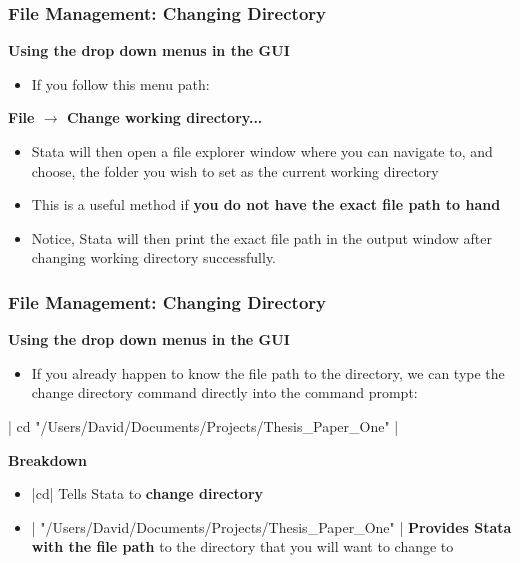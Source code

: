 \documentclass[10pt, compress]{beamer}
\begin{document}
\begin{frame}[fragile]
\frametitle{File Management: Changing Directory}
\textbf{Using the drop down menus in the GUI}
\begin{itemize}
\item If you follow this menu path:
\end{itemize}
\begin{center}
\textbf{File $\to$ Change working directory...}
\end{center}
\begin{itemize}
\item Stata will then open a \alert{file explorer window} where you can navigate to, and choose, the folder you wish to set as the current working directory
\item This is a useful method if \textbf{you do not have the exact file path to hand}
\item Notice, Stata will then print the exact file path in the output window after changing working directory successfully.
\end{itemize}
\end{frame}

\begin{frame}[fragile]
\frametitle{File Management: Changing Directory}
\textbf{Using the drop down menus in the GUI}
\begin{itemize}
\item If you already happen to know the file path to the directory, we can type the change directory command directly into the command prompt:
\end{itemize}
\begin{center}
| cd "/Users/David/Documents/Projects/Thesis_Paper_One" |
\end{center}
\textbf{Breakdown}
\begin{itemize}
\item {}|cd| Tells Stata to \textbf{change directory}
\item {}| "/Users/David/Documents/Projects/Thesis_Paper_One" | \textbf{Provides Stata with the file path} to the directory that you will want to change to
\end{itemize}
\end{frame}
\end{document}
